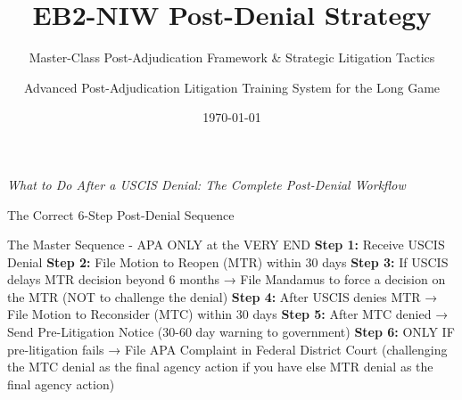 \documentclass[11pt]{beamer}
\title{EB2-NIW Post-Denial Strategy}
\subtitle{Master-Class Post-Adjudication Framework \& Strategic Litigation Tactics}
\author{Advanced Post-Adjudication Litigation Training System for the Long 
Game}
\date{\today}
\begin{document}
	
	\begin{frame}
		\titlepage
		\centering
		\scriptsize \textit{What to Do After a USCIS Denial: The Complete Post-Denial Workflow}
	\end{frame}
	
	
	\begin{frame}{The Correct 6-Step Post-Denial Sequence}
		\scriptsize
		\begin{block}{The Master Sequence - APA ONLY at the VERY END}
			\textbf{Step 1:} Receive USCIS Denial
			\vspace{0.1cm}
			\textbf{Step 2:} File Motion to Reopen (MTR) within 30 days
			\vspace{0.1cm}
			\textbf{Step 3:} If USCIS delays MTR decision beyond 6 months → File Mandamus to force a decision on the MTR (NOT to challenge the denial)
			\vspace{0.1cm}
			\textbf{Step 4:} After USCIS denies MTR → File Motion to Reconsider (MTC) within 30 days
			\vspace{0.1cm}
			\textbf{Step 5:} After MTC denied → Send Pre-Litigation Notice (30-60 day warning to government)
			\vspace{0.1cm}
			\textbf{Step 6:} ONLY IF pre-litigation fails → File APA Complaint in Federal District Court (challenging the MTC denial as the final agency action if you have else MTR denial as the final agency action)
		\end{block}
	\end{frame}
	
\end{document}
